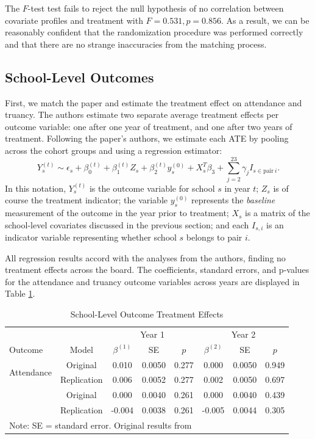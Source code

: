 \documentclass[11pt]{article}
\begin{document}
The $F$-test test fails to reject the
null hypothesis of no correlation between covariate profiles and treatment with
$F = 0.531, p = 0.856$. As a result, we can be reasonably confident that the
randomization procedure was performed correctly and that there are no strange
inaccuracies from the matching process.

\subsection{School-Level Outcomes}
First, we match the paper and estimate the treatment effect on attendance and truancy.
The authors estimate two separate average treatment effects per
outcome variable: one after one year of treatment, and one after two years of treatment.
Following the paper's authors, we estimate each ATE
by pooling across the cohort groups and using a regression estimator:
\[
    Y_s^{(t)}  \sim \epsilon_s + \beta_{0}^{(t)}  + \beta_{1}^{(t)} Z_s + \beta_2^{(t)} y_s^{(0)} + X_s^T\beta_3 + \sum_{j = 2}^{23} \gamma_j I_{s \in \text{pair} \ i}
.\] 
In this notation, $Y_s ^{(t)}$ is the outcome variable for school $s$ in year $t$; $Z_s$ is of course
the treatment indicator; the variable
$y_s ^{(0)}$ represents the \emph{baseline} measurement of the outcome in the year prior to treatment;
$X_s$ is a matrix of the school-level covariates discussed in the previous section; and each $I_{s,i}$ is an indicator
variable representing whether school $s$ belongs to pair $i$.

All regression results accord with the analyses from the authors, finding no
treatment effects across the board. The coefficients, standard errors, and
p-values for the attendance and truancy outcome variables across years are
displayed in Table \ref{table:school_level_regressions}.

\begin{table}[htbp]
    \centering
    \caption{School-Level Outcome Treatment Effects}
    \vspace{0.4em}
    \label{table:school_level_regressions}
    \begin{tabular}{lccccccc}
    \toprule
    & & \multicolumn{3}{c}{Year 1} & \multicolumn{3}{c}{Year 2} \\
    \cmidrule(lr){3-5} \cmidrule(lr){6-8}
    Outcome & Model & $\beta^{(1)}$ & SE & $p$ & $\beta^{(2)}$ & SE & $p$ \\
    \midrule
    \multirow{2}{*}{Attendance} 
    & Original    & 0.010 & 0.0050 & 0.277 & 0.000 & 0.0050 & 0.949 \\
    & Replication & 0.006 & 0.0052 & 0.277 & 0.002 & 0.0050 & 0.697 \\
    \addlinespace[0.5em]
    \multirow{2}{*}{Truancy}    
    & Original    & 0.000 & 0.0040 & 0.261 & 0.000 & 0.0040 & 0.439 \\
    & Replication & -0.004 & 0.0038 & 0.261 & -0.005 & 0.0044 & 0.305 \\
    \bottomrule
    \multicolumn{6}{l}{\small Note: SE = standard error. Original results from \cite{dymnickiAssessingImplementationEffects2021}}
    \end{tabular}
\end{table}
\end{document}
